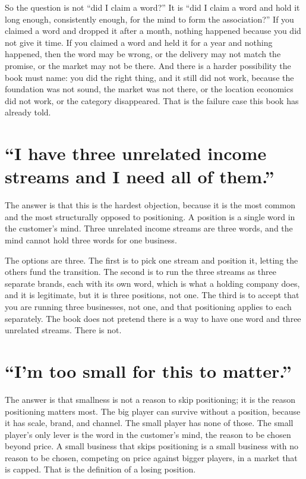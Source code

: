 \documentclass[10pt,twoside,openany]{memoir}
\newcommand{\needspacehead}{\needspace{4\baselineskip}}
\let\oldsection\section
\renewcommand{\section}{\needspacehead\oldsection}
\begin{document}
{{So the question is not ``did I claim a word?'' It is ``did I claim a
word and hold it long enough, consistently enough, for the mind to form
the association?'' If you claimed a word and dropped it after a month,
nothing happened because you did not give it time. If you claimed a word
and held it for a year and nothing happened, then the word may be wrong,
or the delivery may not match the promise, or the market may not be
there. And there is a harder possibility the book must name: you did the
right thing, and it still did not work, because the foundation was not
sound, the market was not there, or the location economics did not work,
or the category disappeared. That is the failure case this book has
already told.

\section{``I have three unrelated income streams and I need all of
them.''}\label{i-have-three-unrelated-income-streams-and-i-need-all-of-them.}

The answer is that this is the hardest objection, because it is the most
common and the most structurally opposed to positioning. A position is a
single word in the customer's mind. Three unrelated income streams are
three words, and the mind cannot hold three words for one business.

The options are three. The first is to pick one stream and position it,
letting the others fund the transition. The second is to run the three
streams as three separate brands, each with its own word, which is what
a holding company does, and it is legitimate, but it is three positions,
not one. The third is to accept that you are running three businesses,
not one, and that positioning applies to each separately. The book does
not pretend there is a way to have one word and three unrelated streams.
There is not.

\section{``I'm too small for this to
matter.''}\label{im-too-small-for-this-to-matter.}

The answer is that smallness is not a reason to skip positioning; it is
the reason positioning matters most. The big player can survive without
a position, because it has scale, brand, and channel. The small player
has none of those. The small player's only lever is the word in the
customer's mind, the reason to be chosen beyond price. A small business
that skips positioning is a small business with no reason to be chosen,
competing on price against bigger players, in a market that is capped.
That is the definition of a losing position.

}}
\end{document}
